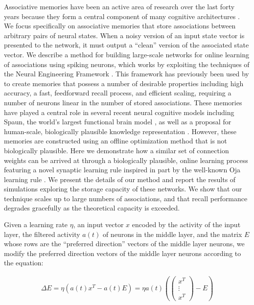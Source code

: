 Associative memories have been an active area of research over the last forty years \citep{willshaw1969nonholographic, kohonen1972, hopfield1982} because they form a central component of many cognitive architectures \citep{Pollack1988, Anderson1998}. We focus specifically on associative memories that store associations between arbitrary pairs of neural states. When a noisy version of an input state vector is presented to the network, it must output a ``clean'' version of the associated state vector. We describe a method for building large-scale networks for online learning of associations using spiking neurons, which works by exploiting the techniques of the Neural Engineering Framework \citep{eliasmith2003a}. This framework has previously been used by \citet{stewart2011biologically} to create memories that possess a number of desirable properties including high accuracy, a fast, feedforward recall process, and efficient scaling, requiring a number of neurons linear in the number of stored associations. These memories have played a central role in several recent neural cognitive models including Spaun, the world's largest functional brain model \citep{eliasmith2012}, as well as a proposal for human-scale, biologically plausible knowledge representation \citep{crawford2015}. However, these memories are constructed using an offline optimization method that is not biologically plausible.  Here we demonstrate how a similar set of connection weights can be arrived at through a biologically plausible, online learning process featuring a novel synaptic learning rule inspired in part by the well-known Oja learning rule \citep{oja1989neural}. We present the details of our method and report the results of simulations exploring the storage capacity of these networks. We show that our technique scales up to large numbers of associations, and that recall performance degrades gracefully as the theoretical capacity is exceeded. 

Given a learning rate $\eta$, an input vector $x$ encoded by the activity of the input layer, the filtered activity $a(t)$ of  neurons in the middle layer, and the matrix $E$ whose rows are the ``preferred direction'' vectors of the middle layer neurons, we modify the preferred direction vectors of the middle layer neurons according to the equation:

\begin{align} \label{voja}
    \Delta{E} = \eta(a(t) x^T - a(t)E) = \eta a(t) (\begin{pmatrix}x^T \\ \vdots \\ x^T\end{pmatrix} - E)
\end{align}

